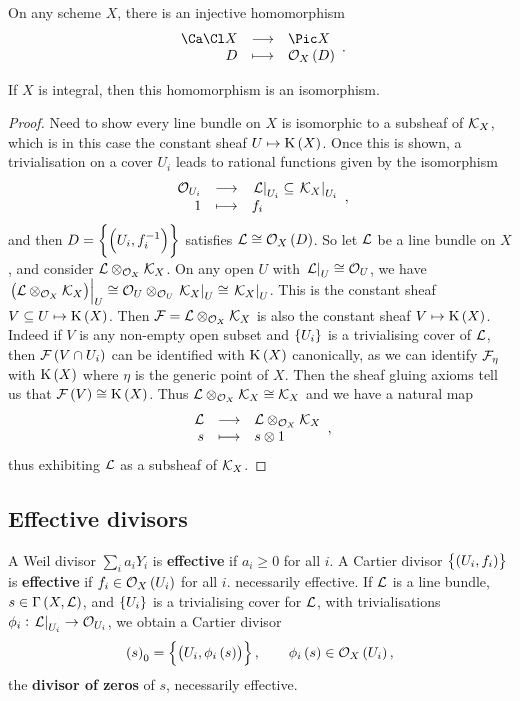 \begin{corollary}
On any scheme $ X $, there is an injective homomorphism
$$ \function{\Ca\Cl X}{\Pic X}{D}{\OOO_X\br{D}}. $$
\end{corollary}

\begin{proposition}
If $ X $ is integral, then this homomorphism is an isomorphism.
\end{proposition}

\begin{proof}
Need to show every line bundle on $ X $ is isomorphic to a subsheaf of $ \mathcal{K}_X $, which is in this case the constant sheaf $ U \mapsto \K\br{X} $. Once this is shown, a trivialisation on a cover $ U_i $ leads to rational functions given by the isomorphism
$$ \function{\OOO_{U_i}}{\eval{\LLL}_{U_i} \subseteq \eval{\KKK_X}_{U_i}}{1}{f_i}, $$
and then $ D = \cbr{\br{U_i, f_i^{-1}}} $ satisfies $ \LLL \cong \OOO_X\br{D} $. So let $ \mathcal{L} $ be a line bundle on $ X $, and consider $ \mathcal{L} \otimes_{\mathcal{O}_X} \mathcal{K}_X $. On any open $ U $ with $ \left. \mathcal{L} \right|_U \cong \mathcal{O}_U $, we have $ \eval{\br{\LLL \otimes_{\OOO_X} \KKK_X}}_U \cong \OOO_U \otimes_{\OOO_U} \eval{\KKK_X}_U \cong \eval{\KKK_X}_U $. This is the constant sheaf $ V \subseteq U \mapsto \K\br{X} $. Then $ \mathcal{F} = \mathcal{L} \otimes_{\mathcal{O}_X} \mathcal{K}_X $ is also the constant sheaf $ V \mapsto \K\br{X} $. Indeed if $ V $ is any non-empty open subset and $ \cbr{U_i} $ is a trivialising cover of $ \mathcal{L} $, then $ \FFF\br{V \cap U_i} $ can be identified with $ \K\br{X} $ canonically, as we can identify $ \mathcal{F}_\eta $ with $ \K\br{X} $ where $ \eta $ is the generic point of $ X $. Then the sheaf gluing axioms tell us that $ \FFF\br{V} \cong \K\br{X} $. Thus $ \mathcal{L} \otimes_{\mathcal{O}_X} \mathcal{K}_X \cong \mathcal{K}_X $ and we have a natural map
$$ \function{\LLL}{\LLL \otimes_{\OOO_X} \KKK_X}{s}{s \otimes 1}, $$
thus exhibiting $ \mathcal{L} $ as a subsheaf of $ \mathcal{K}_X $.
\end{proof}

\pagebreak

\subsection{Effective divisors}

\begin{definition*}
A Weil divisor $ \sum_i a_iY_i $ is \textbf{effective} if $ a_i \ge 0 $ for all $ i $. A Cartier divisor $ \cbr{\br{U_i, f_i}} $ is \textbf{effective} if $ f_i \in \OOO_X\br{U_i} $ for all $ i $.
necessarily effective. If $ \mathcal{L} $ is a line bundle, $ s \in \Gamma\br{X, \LLL} $, and $ \cbr{U_i} $ is a trivialising cover for $ \mathcal{L} $, with trivialisations $ \phi_i : \left. \mathcal{L} \right|_{U_i} \to \mathcal{O}_{U_i} $, we obtain a Cartier divisor
$$ \br{s}_0 = \cbr{\br{U_i, \phi_i\br{s}}}, \qquad \phi_i\br{s} \in \OOO_X\br{U_i}, $$
the \textbf{divisor of zeros} of $ s $, necessarily effective.
\end{definition*}

